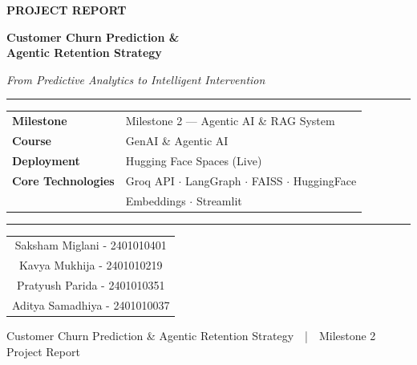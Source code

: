 \documentclass[12pt, a4paper]{article}
\begin{document}
\begin{titlepage}
    \centering
    \vspace*{3cm}

    {\Huge\bfseries\color{headerblue} PROJECT REPORT}

    \vspace{1cm}

    {\LARGE\bfseries Customer Churn Prediction \&\\Agentic Retention Strategy}

    \vspace{0.5cm}

    {\large\textit{From Predictive Analytics to Intelligent Intervention}}

    \vspace{2cm}

    \rule{\textwidth}{0.5pt}

    \vspace{1cm}

    \begin{tabular}{@{} l l @{}}
    \textbf{\color{headerblue}Milestone}           & Milestone 2 --- Agentic AI \& RAG System \\[0.5em]
    \textbf{\color{headerblue}Course}              & GenAI \& Agentic AI \\[0.5em]
    \textbf{\color{headerblue}Deployment}          & Hugging Face Spaces (Live) \\[0.5em]
    \textbf{\color{headerblue}Core Technologies}   & Groq API $\cdot$ LangGraph $\cdot$ FAISS $\cdot$ HuggingFace \\
                                                    & Embeddings $\cdot$ Streamlit \\
    \end{tabular}
    \vspace{1.5cm}

    \rule{\textwidth}{0.5pt}
    \vspace{1.5cm}

    \begin{tabular}{c}
        Saksham Miglani - 2401010401 \\
        Kavya Mukhija - 2401010219\\
        Pratyush Parida - 2401010351 \\
        Aditya Samadhiya - 2401010037
    \end{tabular}
    \vfill

    {\small Customer Churn Prediction \& Agentic Retention Strategy~~|~~Milestone 2 Project Report}

\end{titlepage}
\end{document}
